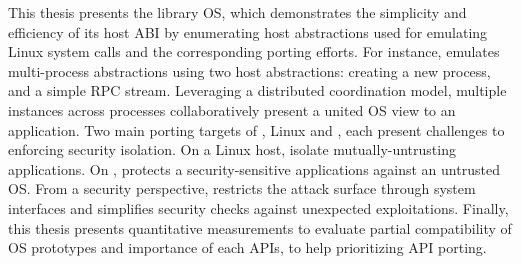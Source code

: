 This thesis presents the \graphene{} library OS, which demonstrates
the simplicity and efficiency of its host ABI
by enumerating host abstractions used for emulating
Linux system calls
and the corresponding porting efforts.
For instance, \graphene{} emulates multi-process abstractions %
using two host abstractions:
creating a new process, and a simple RPC stream.
Leveraging a distributed coordination model, multiple \graphene{} instances across processes collaboratively present a united OS view to an application.
Two main porting targets of \graphene{}, 
Linux and \sgx{},
each present challenges to enforcing security isolation.
On a Linux host, \graphene{} %
isolate mutually-untrusting applications.
On \sgx{}, \graphene{} protects a security-sensitive applications %
against an untrusted OS.
From a security perspective,
\graphene{} restricts the attack surface through system interfaces and simplifies security checks against unexpected exploitations.
Finally, this thesis presents quantitative measurements to evaluate
partial compatibility of OS prototypes
and importance of each APIs, to help prioritizing API porting.

 













